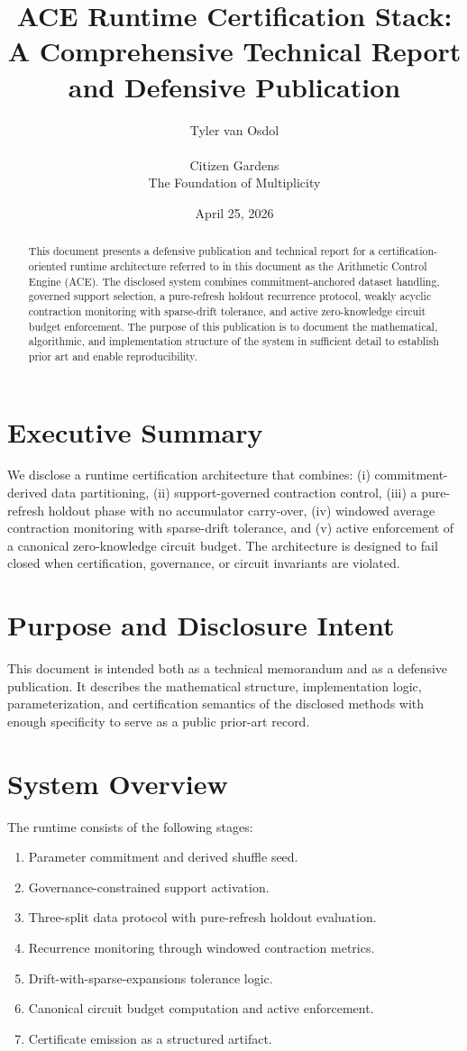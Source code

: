 \documentclass[11pt]{article}
\title{ACE Runtime Certification Stack:\\
A Comprehensive Technical Report and Defensive Publication}
\author{Tyler van Osdol \\ \\ Citizen Gardens \\ The Foundation of Multiplicity}
\date{April 25, 2026}
\begin{document}
\maketitle

\begin{abstract}
This document presents a defensive publication and technical report for a certification-oriented runtime architecture referred to in this document as the Arithmetic Control Engine (ACE). The disclosed system combines commitment-anchored dataset handling, governed support selection, a pure-refresh holdout recurrence protocol, weakly acyclic contraction monitoring with sparse-drift tolerance, and active zero-knowledge circuit budget enforcement. The purpose of this publication is to document the mathematical, algorithmic, and implementation structure of the system in sufficient detail to establish prior art and enable reproducibility.
\end{abstract}
\newpage
\tableofcontents
\newpage

\section{Executive Summary}
We disclose a runtime certification architecture that combines: (i) commitment-derived data partitioning, (ii) support-governed contraction control, (iii) a pure-refresh holdout phase with no accumulator carry-over, (iv) windowed average contraction monitoring with sparse-drift tolerance, and (v) active enforcement of a canonical zero-knowledge circuit budget. The architecture is designed to fail closed when certification, governance, or circuit invariants are violated.

\section{Purpose and Disclosure Intent}
This document is intended both as a technical memorandum and as a defensive publication. It describes the mathematical structure, implementation logic, parameterization, and certification semantics of the disclosed methods with enough specificity to serve as a public prior-art record.

\section{System Overview}
The runtime consists of the following stages:
\begin{enumerate}[label=\arabic*.]
    \item Parameter commitment and derived shuffle seed.
    \item Governance-constrained support activation.
    \item Three-split data protocol with pure-refresh holdout evaluation.
    \item Recurrence monitoring through windowed contraction metrics.
    \item Drift-with-sparse-expansions tolerance logic.
    \item Canonical circuit budget computation and active enforcement.
    \item Certificate emission as a structured artifact.
\end{enumerate}
\end{document}
